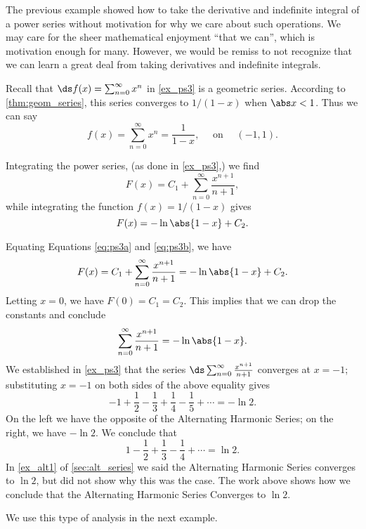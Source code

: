 The previous example showed how to take the derivative and indefinite integral of a power series without motivation for why we care about such operations. We may care for the sheer mathematical enjoyment ``that we can'', which is motivation enough for many. However, we would be remiss to not recognize that we can learn a great deal from taking derivatives and indefinite integrals.\bigskip

Recall that $\ds f(x) = \sum_{n=0}^\infty x^n$ in \autoref{ex_ps3} is a geometric series. According to \autoref{thm:geom_series}, this series converges to $1/(1-x)$ when $\abs x<1$. Thus we can say
\begin{equation}
f(x) = \sum_{n=0}^\infty x^n = \frac 1{1-x},\quad \text{ on }\quad (-1,1).
\label{eq:power_series_geometric}
\end{equation}

Integrating the power series, (as done in \autoref{ex_ps3},) we find
\begin{equation}
F(x)  = C_1+\sum_{n=0}^\infty \frac{x^{n+1}}{n+1},\label{eq:ps3a}
\end{equation}
while integrating the function $f(x) = 1/(1-x)$ gives
\begin{equation} F(x)  = -\ln\abs{1-x} + C_2.\label{eq:ps3b}\end{equation}

Equating Equations \eqref{eq:ps3a} and \eqref{eq:ps3b}, we have 
\[F(x) = C_1+\sum_{n=0}^\infty \frac{x^{n+1}}{n+1} = -\ln\abs{1-x} + C_2.\]
Letting $x=0$, we have $F(0) = C_1 = C_2$. This implies that we can drop the constants and conclude
\[\sum_{n=0}^\infty \frac{x^{n+1}}{n+1} = -\ln\abs{1-x}.\]
We established in \autoref{ex_ps3} that the series $\ds\sum_{n=0}^\infty \frac{x^{n+1}}{n+1}$ converges at $x=-1$; substituting $x=-1$ on both sides of the above equality gives
\[-1+\frac12-\frac13+\frac14-\frac15+\dotsb = -\ln 2.\]
On the left we have the opposite of the Alternating Harmonic Series; on the right, we have $-\ln 2$. We conclude that 
\[1-\frac12+\frac13-\frac14+\dotsb = \ln 2.\]
In \autoref{ex_alt1} of \autoref{sec:alt_series} we said the Alternating Harmonic Series converges to $\ln 2$, but did not show why this was the case. The work above shows how we conclude that the Alternating Harmonic Series Converges to $\ln 2$. 

We use this type of analysis in the next example.

